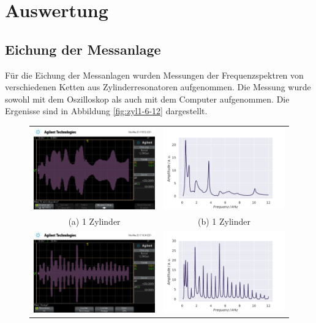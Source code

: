 \section{Auswertung}
\label{sec:auswertung}

\subsection{Eichung der Messanlage}
Für die Eichung der Messanlagen wurden Messungen der Frequenzspektren von verschiedenen Ketten aus Zylinderresonatoren aufgenommen. Die Messung wurde sowohl mit dem Oszilloskop als auch mit dem Computer aufgenommen. Die Ergenisse sind in 
Abbildung \ref{fig:zyl1-6-12} dargestellt. 
\begin{figure}[H]
    \centering
    \begin{tabular}{cc}
      \includegraphics[width=65mm]{Daten/Zyinder/Zylinder_1.png} &   \includegraphics[width=65mm]{Daten/Zyinder/Zylinder_1.pdf} \\
    (a) 1 Zylinder & (b) 1 Zylinder \\[6pt]
     \includegraphics[width=65mm]{Daten/Zyinder/Zylinder_6.png} &   \includegraphics[width=65mm]{Daten/Zyinder/Zylinder_6.pdf} \\

\end{tabular}
\end{figure}
